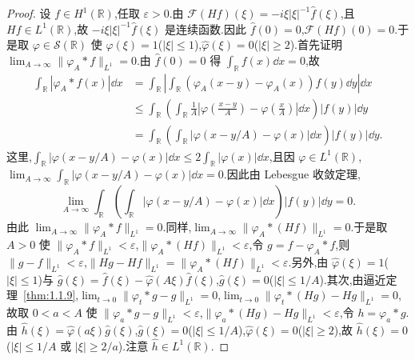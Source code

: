 \begin{proof}
设 $f \in H^{1}(\mathbb{R})$,任取 $\varepsilon > 0$.由 $\mathcal{F}(Hf)(\xi) = -i\xi|\xi|^{-1}\hat{f}(\xi)$,且 $Hf \in L^{1}(\mathbb{R})$,故 $-i\xi|\xi|^{-1}\hat{f}(\xi)$ 是连续函数.因此 $\hat{f}(0) = 0$,$\mathcal{F}(Hf)(0) = 0$.于是取 $\varphi \in \mathcal{S}(\mathbb{R})$ 使 $\hat{\varphi}(\xi) = 1$($|\xi| \leq 1$),$\hat{\varphi}(\xi) = 0$($|\xi| \geq 2$).首先证明 $\lim_{A \to \infty}\| \varphi_{A} * f \|_{L^{1}} = 0$.由 $\hat{f}(0) = 0$ 得 $\int_{\mathbb{R}}f(x)\dd x = 0$,故
\begin{align*}
\displaystyle\int_{\mathbb{R}}|\varphi_{A} * f(x)|\dd x & = \int_{\mathbb{R}}\left|\int_{\mathbb{R}}\left(\varphi_{A}(x - y) - \varphi_{A}(x)\right)f(y)\dd y\right|\dd x \\
& \leq \displaystyle\int_{\mathbb{R}}\left(\int_{\mathbb{R}}\frac{1}{A}\left|\varphi\left(\frac{x - y}{A}\right) - \varphi\left(\frac{x}{A}\right)\right|\dd x\right)|f(y)|\dd y \\
& = \displaystyle\int_{\mathbb{R}}\left(\int_{\mathbb{R}}|\varphi(x - y/A) - \varphi(x)|\dd x\right)|f(y)|\dd y.
\end{align*}
这里,$\int_{\mathbb{R}}|\varphi(x - y/A) - \varphi(x)|\dd x \leq 2\int_{\mathbb{R}}|\varphi(x)|\dd x$,且因 $\varphi \in L^{1}(\mathbb{R})$,$\lim_{A \to \infty}\int_{\mathbb{R}}|\varphi(x - y/A) - \varphi(x)|\dd x = 0$.因此由 Lebesgue 收敛定理,
\begin{equation*}
\lim_{A \to \infty}\int_{\mathbb{R}}\left(\int_{\mathbb{R}}|\varphi(x - y/A) - \varphi(x)|\dd x\right)|f(y)|\dd y = 0.
\end{equation*}
由此 $\lim_{A \to \infty}\| \varphi_{A} * f \|_{L^{1}} = 0$.同样,$\lim_{A \to \infty}\| \varphi_{A} * (Hf) \|_{L^{1}} = 0$.于是取 $A > 0$ 使 $\| \varphi_{A} * f \|_{L^{1}} < \varepsilon$,$\| \varphi_{A} * (Hf) \|_{L^{1}} < \varepsilon$,令 $g = f - \varphi_{A} * f$,则 $\| g - f \|_{L^{1}} < \varepsilon$,$\| Hg - Hf \|_{L^{1}} = \| \varphi_{A} * (Hf) \|_{L^{1}} < \varepsilon$.另外,由 $\hat{\varphi}(\xi) = 1$($|\xi| \leq 1$)与 $\hat{g}(\xi) = \hat{f}(\xi) - \hat{\varphi}(A\xi)\hat{f}(\xi)$,$\hat{g}(\xi) = 0$($|\xi| \leq 1/A$).其次,由逼近定理~\ref{thm:1.1.9},$\lim_{t \to 0}\| \varphi_{t} * g - g \|_{L^{1}} = 0$,$\lim_{t \to 0}\| \varphi_{t} * (Hg) - Hg \|_{L^{1}} = 0$,故取 $0 < a < A$ 使 $\| \varphi_{a} * g - g \|_{L^{1}} < \varepsilon$,$\| \varphi_{a} * (Hg) - Hg \|_{L^{1}} < \varepsilon$,令 $h = \varphi_{a} * g$.由 $\hat{h}(\xi) = \hat{\varphi}(a\xi)\hat{g}(\xi)$,$\hat{g}(\xi) = 0$($|\xi| \leq 1/A$),$\hat{\varphi}(\xi) = 0$($|\xi| \geq 2$),故 $\hat{h}(\xi) = 0$($|\xi| \leq 1/A$ 或 $|\xi| \geq 2/a$).注意 $\hat{h} \in L^{1}(\mathbb{R})$.


\end{proof}
